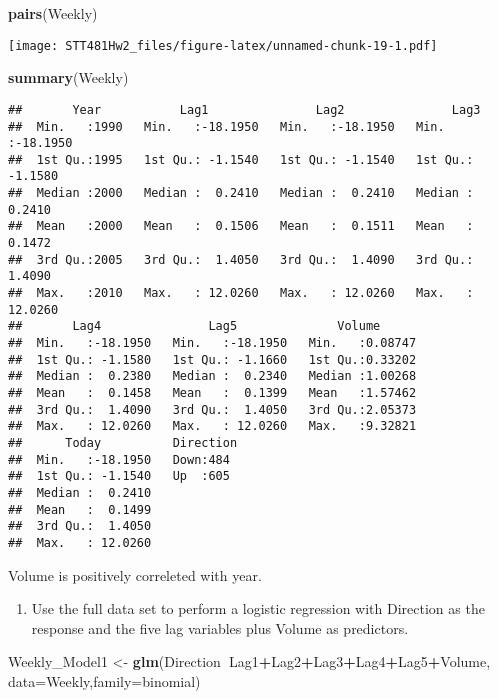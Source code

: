 \documentclass[]{article}
\newenvironment{Shaded}{\begin{snugshade}}{\end{snugshade}}
\newcommand{\KeywordTok}[1]{\textcolor[rgb]{0.13,0.29,0.53}{\textbf{#1}}}
\newcommand{\DataTypeTok}[1]{\textcolor[rgb]{0.13,0.29,0.53}{#1}}
\newcommand{\StringTok}[1]{\textcolor[rgb]{0.31,0.60,0.02}{#1}}
\newcommand{\OperatorTok}[1]{\textcolor[rgb]{0.81,0.36,0.00}{\textbf{#1}}}
\newcommand{\NormalTok}[1]{#1}
\providecommand{\tightlist}{%
  \setlength{\itemsep}{0pt}\setlength{\parskip}{0pt}}
\begin{document}
\begin{Shaded}
\begin{Highlighting}[]
\KeywordTok{pairs}\NormalTok{(Weekly)}
\end{Highlighting}
\end{Shaded}

\texttt{[image: STT481Hw2\_files/figure-latex/unnamed-chunk-19-1.pdf]}

\begin{Shaded}
\begin{Highlighting}[]
\KeywordTok{summary}\NormalTok{(Weekly)}
\end{Highlighting}
\end{Shaded}

\begin{verbatim}
##       Year           Lag1               Lag2               Lag3         
##  Min.   :1990   Min.   :-18.1950   Min.   :-18.1950   Min.   :-18.1950  
##  1st Qu.:1995   1st Qu.: -1.1540   1st Qu.: -1.1540   1st Qu.: -1.1580  
##  Median :2000   Median :  0.2410   Median :  0.2410   Median :  0.2410  
##  Mean   :2000   Mean   :  0.1506   Mean   :  0.1511   Mean   :  0.1472  
##  3rd Qu.:2005   3rd Qu.:  1.4050   3rd Qu.:  1.4090   3rd Qu.:  1.4090  
##  Max.   :2010   Max.   : 12.0260   Max.   : 12.0260   Max.   : 12.0260  
##       Lag4               Lag5              Volume       
##  Min.   :-18.1950   Min.   :-18.1950   Min.   :0.08747  
##  1st Qu.: -1.1580   1st Qu.: -1.1660   1st Qu.:0.33202  
##  Median :  0.2380   Median :  0.2340   Median :1.00268  
##  Mean   :  0.1458   Mean   :  0.1399   Mean   :1.57462  
##  3rd Qu.:  1.4090   3rd Qu.:  1.4050   3rd Qu.:2.05373  
##  Max.   : 12.0260   Max.   : 12.0260   Max.   :9.32821  
##      Today          Direction 
##  Min.   :-18.1950   Down:484  
##  1st Qu.: -1.1540   Up  :605  
##  Median :  0.2410             
##  Mean   :  0.1499             
##  3rd Qu.:  1.4050             
##  Max.   : 12.0260
\end{verbatim}

Volume is positively correleted with year.

\begin{enumerate}
\def\labelenumi{(\alph{enumi})}
\setcounter{enumi}{1}
\tightlist
\item
  Use the full data set to perform a logistic regression with Direction
  as the response and the five lag variables plus Volume as predictors.
\end{enumerate}

\begin{Shaded}
\begin{Highlighting}[]
\NormalTok{Weekly_Model1 <-}\StringTok{ }\KeywordTok{glm}\NormalTok{(Direction}\OperatorTok{~}\NormalTok{Lag1}\OperatorTok{+}\NormalTok{Lag2}\OperatorTok{+}\NormalTok{Lag3}\OperatorTok{+}\NormalTok{Lag4}\OperatorTok{+}\NormalTok{Lag5}\OperatorTok{+}\NormalTok{Volume, }\DataTypeTok{data=}\NormalTok{Weekly,}\DataTypeTok{family=}\NormalTok{binomial)}
\end{Highlighting}
\end{Shaded}
\end{document}
